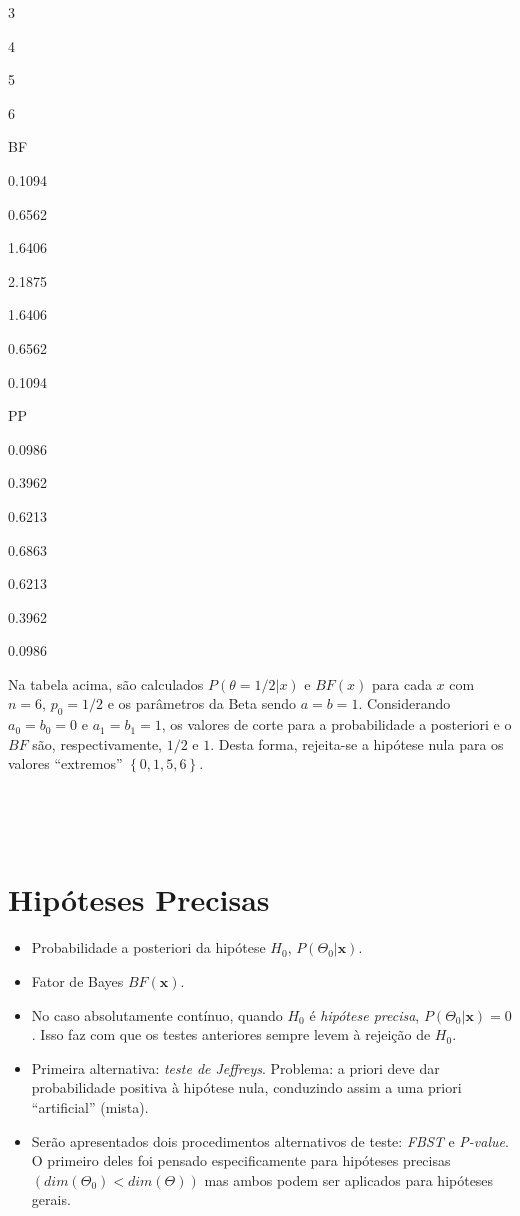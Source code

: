 \documentclass[
]{book}
\begin{document}
3

4

5

6

BF

0.1094

0.6562

1.6406

2.1875

1.6406

0.6562

0.1094

PP

0.0986

0.3962

0.6213

0.6863

0.6213

0.3962

0.0986

Na tabela acima, são calculados \(P(\theta=1/2|x)\) e \(BF(x)\) para cada \(x\) com \(n=6\), \(p_0=1/2\) e os parâmetros da Beta sendo \(a=b=1\). Considerando \(a_0=b_0=0\) e \(a_1=b_1=1\), os valores de corte para a probabilidade a posteriori e o \(BF\) são, respectivamente, \(1/2\) e \(1\). Desta forma, rejeita-se a hipótese nula para os valores ``extremos'' \(\left\{0,1,5,6\right\}\).

\(~\)

\(~\)

\hypertarget{hipuxf3teses-precisas}{%
\section{Hipóteses Precisas}\label{hipuxf3teses-precisas}}

\begin{itemize}
\item
  Probabilidade a posteriori da hipótese \(H_0\), \(P(\Theta_0|\boldsymbol x)\).
\item
  Fator de Bayes \(BF(\boldsymbol x)\).
\item
  No caso absolutamente contínuo, quando \(H_0\) é \emph{hipótese precisa}, \(P(\Theta_0|\boldsymbol x)=0\). Isso faz com que os testes anteriores sempre levem à rejeição de \(H_0\).
\item
  Primeira alternativa: \emph{teste de Jeffreys}. Problema: a priori deve dar probabilidade positiva à hipótese nula, conduzindo assim a uma priori ``artificial'' (mista).
\item
  Serão apresentados dois procedimentos alternativos de teste: \emph{FBST} e \emph{P-value}. O primeiro deles foi pensado especificamente para hipóteses precisas \(\left(dim(\Theta_0)<dim(\Theta)\right)\) mas ambos podem ser aplicados para hipóteses gerais.
\end{itemize}
\end{document}
